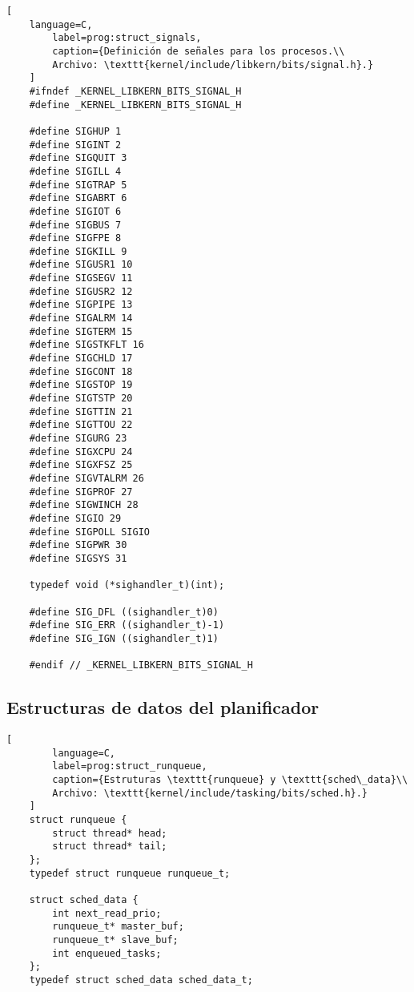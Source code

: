 \begin{lstlisting}[
	language=C,
		label=prog:struct_signals,
		caption={Definición de señales para los procesos.\\
		Archivo: \texttt{kernel/include/libkern/bits/signal.h}.}
	]
	#ifndef _KERNEL_LIBKERN_BITS_SIGNAL_H
	#define _KERNEL_LIBKERN_BITS_SIGNAL_H
	
	#define SIGHUP 1
	#define SIGINT 2
	#define SIGQUIT 3
	#define SIGILL 4
	#define SIGTRAP 5
	#define SIGABRT 6
	#define SIGIOT 6
	#define SIGBUS 7
	#define SIGFPE 8
	#define SIGKILL 9
	#define SIGUSR1 10
	#define SIGSEGV 11
	#define SIGUSR2 12
	#define SIGPIPE 13
	#define SIGALRM 14
	#define SIGTERM 15
	#define SIGSTKFLT 16
	#define SIGCHLD 17
	#define SIGCONT 18
	#define SIGSTOP 19
	#define SIGTSTP 20
	#define SIGTTIN 21
	#define SIGTTOU 22
	#define SIGURG 23
	#define SIGXCPU 24
	#define SIGXFSZ 25
	#define SIGVTALRM 26
	#define SIGPROF 27
	#define SIGWINCH 28
	#define SIGIO 29
	#define SIGPOLL SIGIO
	#define SIGPWR 30
	#define SIGSYS 31
	
	typedef void (*sighandler_t)(int);
	
	#define SIG_DFL ((sighandler_t)0)
	#define SIG_ERR ((sighandler_t)-1)
	#define SIG_IGN ((sighandler_t)1)
	
	#endif // _KERNEL_LIBKERN_BITS_SIGNAL_H
\end{lstlisting}






\subsection{Estructuras de datos del planificador}

\begin{lstlisting}[
		language=C,
		label=prog:struct_runqueue,
		caption={Estruturas \texttt{runqueue} y \texttt{sched\_data}\\
		Archivo: \texttt{kernel/include/tasking/bits/sched.h}.}
	]
	struct runqueue {
		struct thread* head;
		struct thread* tail;
	};
	typedef struct runqueue runqueue_t;
	
	struct sched_data {
		int next_read_prio;
		runqueue_t* master_buf;
		runqueue_t* slave_buf;
		int enqueued_tasks;
	};
	typedef struct sched_data sched_data_t;
\end{lstlisting}

